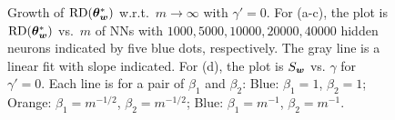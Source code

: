 \documentclass[twoside,11pt]{article}
\begin{document}
\begin{figure}
    \centering
    \caption{Growth of $\mathrm{RD}(\bm{\theta}^*_{\bm{w}})$ w.r.t.\ $m\to\infty$ with $\gamma'=0$. For (a-c), the plot is $\mathrm{RD}(\bm{\theta}^*_{\bm{w}})$ vs.\ $m$ of NNs with $1000,5000,10000,20000,40000$ hidden neurons indicated by five blue dots, respectively. The gray line is a linear fit with slope indicated. For (d), the plot is $S_{\bm{w}}$ vs. $\gamma$ for $\gamma'=0$. Each line is for a pair of $\beta_1$ and $\beta_2$: Blue: $\beta_1=1$, $\beta_2=1$; Orange: $\beta_1=m^{-1/2}$, $\beta_2=m^{-1/2}$; Blue: $\beta_1=m^{-1}$, $\beta_2=m^{-1}$.}
    \label{fig:diffbeta}
\end{figure}
\end{document}
